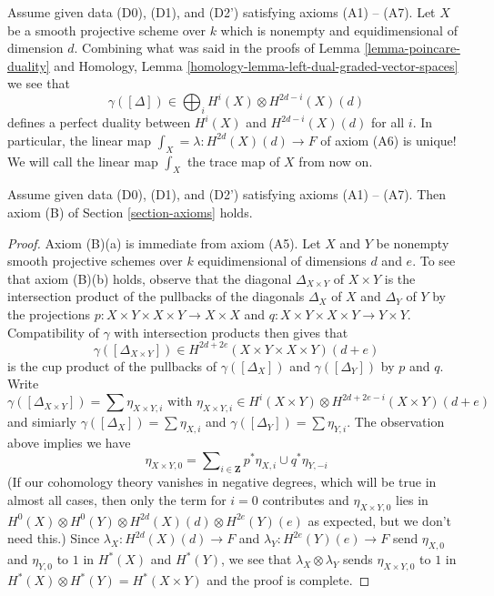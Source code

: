 \begin{remark}
\label{remark-trace}
Assume given data (D0), (D1), and (D2') satisfying axioms (A1) -- (A7).
Let $X$ be a smooth projective scheme over $k$ which is nonempty
and equidimensional of dimension $d$. Combining what was said in
the proofs of Lemma \ref{lemma-poincare-duality} and
Homology, Lemma \ref{homology-lemma-left-dual-graded-vector-spaces}
we see that
$$
\gamma([\Delta]) \in \bigoplus\nolimits_i H^i(X) \otimes H^{2d - i}(X)(d)
$$
defines a perfect duality between $H^i(X)$ and $H^{2d - i}(X)(d)$
for all $i$.
In particular, the linear map $\int_X = \lambda : H^{2d}(X)(d) \to F$ of
axiom (A6) is unique! We will call the linear map $\int_X$ the trace map
of $X$ from now on.
\end{remark}

\begin{lemma}
\label{lemma-trace-product}
Assume given data (D0), (D1), and (D2') satisfying axioms (A1) -- (A7).
Then axiom (B) of Section \ref{section-axioms} holds.
\end{lemma}

\begin{proof}
Axiom (B)(a) is immediate from axiom (A5).
Let $X$ and $Y$ be nonempty smooth projective schemes over $k$
equidimensional of dimensions $d$ and $e$. To see that axiom (B)(b)
holds, observe that the diagonal $\Delta_{X \times Y}$ of $X \times Y$
is the intersection product of the pullbacks of the diagonals
$\Delta_X$ of $X$ and $\Delta_Y$ of $Y$ by the projections
$p : X \times Y \times X \times Y \to X \times X$ and
$q : X \times Y \times X \times Y \to Y \times Y$.
Compatibility of $\gamma$ with intersection products then gives
that
$$
\gamma([\Delta_{X \times Y}]) \in
H^{2d + 2e}(X \times Y \times X \times Y)(d + e)
$$
is the cup product of the pullbacks of $\gamma([\Delta_X])$
and $\gamma([\Delta_Y])$ by $p$ and $q$. Write
$$
\gamma([\Delta_{X \times Y}]) = \sum \eta_{X \times Y, i}
\text{ with }
\eta_{X \times Y, i} \in
H^i(X \times Y) \otimes H^{2d + 2e - i}(X \times Y)(d + e)
$$
and simiarly $\gamma([\Delta_X]) = \sum \eta_{X, i}$ and
$\gamma([\Delta_Y]) = \sum \eta_{Y, i}$. The observation above
implies we have
$$
\eta_{X \times Y, 0} =
\sum\nolimits_{i \in \mathbf{Z}} p^*\eta_{X, i} \cup q^*\eta_{Y, -i}
$$
(If our cohomology theory vanishes in negative degrees, which will
be true in almost all cases, then only the term for $i = 0$ contributes
and $\eta_{X \times Y, 0}$ lies in
$H^0(X) \otimes H^0(Y) \otimes H^{2d}(X)(d) \otimes H^{2e}(Y)(e)$ as expected,
but we don't need this.) Since $\lambda_X : H^{2d}(X)(d) \to F$ and 
$\lambda_Y : H^{2e}(Y)(e) \to F$ send $\eta_{X, 0}$ and $\eta_{Y, 0}$
to $1$ in $H^*(X)$ and $H^*(Y)$, we see that $\lambda_X \otimes \lambda_Y$
sends $\eta_{X \times Y, 0}$ to $1$ in
$H^*(X) \otimes H^*(Y) = H^*(X \times Y)$ and the proof is complete.
\end{proof}

